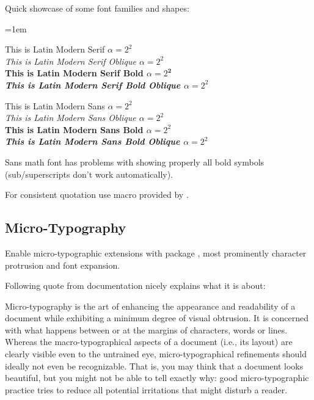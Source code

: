 \begin{example}
    Quick showcase of some font families and shapes:\par \leftskip=1em

    {                  This is Latin Modern Serif \(\alpha = 2^{2}\)}\\
    {\slshape          This is Latin Modern Serif Oblique \(\alpha = 2^{2}\)}\\
    {\bfseries         This is Latin Modern Serif Bold \(\alpha = 2^{\bm{{2}}}\)}\\
    {\bfseries\slshape This is Latin Modern Serif Bold Oblique \(\alpha = 2^{2}\)}

    {\sffamily                  This is Latin Modern Sans \(\alpha = 2^{2}\)}\\
    {\sffamily\slshape          This is Latin Modern Sans Oblique \(\alpha = 2^{2}\)}\\
    {\sffamily\bfseries         This is Latin Modern Sans Bold \(\alpha = 2^{2}\)}\\
    {\sffamily\bfseries\slshape This is Latin Modern Sans Bold Oblique \(\alpha = 2^{2}\)}
\end{example}
\begin{Note}
    Sans math font has problems with showing properly all bold symbols (sub/superscripts don't work automatically).
\end{Note}

For consistent quotation use \macro{\enquote} macro provided by .

\subsection{\texorpdfstring{Micro-\!Typography}{Micro-Typography}}%
\label{sub:Micro-Typography}

Enable micro-typographic extensions with package , most prominently character protrusion and font expansion.

Following quote from  documentation nicely explains what it is about:
\begin{displayquote}
    Micro-typography is the art of enhancing the appearance and readability of a document while exhibiting a minimum degree of visual obtrusion.
    It is concerned with what happens between or at the margins of characters, words or lines.
    Whereas the macro-typographical aspects of a document (i.e., its layout) are clearly visible even to the untrained eye, micro-typographical refinements should ideally not even be recognizable.
    That is, you may think that a document looks beautiful, but you might not be able to tell exactly why: good micro-typographic practice tries to reduce all potential irritations that might disturb a reader.
\end{displayquote}



